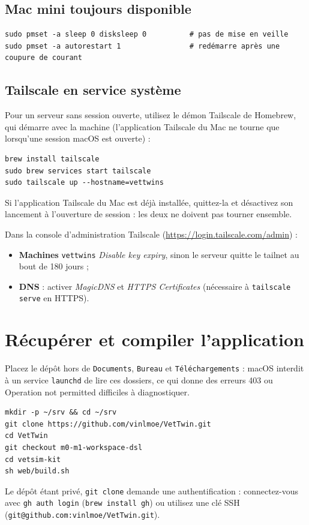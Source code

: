 \documentclass[11pt,a4paper]{article}
\newcommand{\cmd}[1]{\texttt{#1}}
\begin{document}
\subsection{Mac mini toujours disponible}
\begin{Verbatim}
sudo pmset -a sleep 0 disksleep 0          # pas de mise en veille
sudo pmset -a autorestart 1                # redémarre après une coupure de courant
\end{Verbatim}

\subsection{Tailscale en service système}
Pour un serveur sans session ouverte, utilisez le démon Tailscale de Homebrew, qui démarre avec la machine (l'application Tailscale du Mac ne tourne que lorsqu'une session macOS est ouverte) :
\begin{Verbatim}
brew install tailscale
sudo brew services start tailscale
sudo tailscale up --hostname=vettwins
\end{Verbatim}
Si l'application Tailscale du Mac est déjà installée, quittez-la et désactivez son lancement à l'ouverture de session : les deux ne doivent pas tourner ensemble.

Dans la console d'administration Tailscale (\url{https://login.tailscale.com/admin}) :
\begin{itemize}
  \item \textbf{Machines} \textrightarrow{} \cmd{vettwins} \textrightarrow{} \emph{Disable key expiry}, sinon le serveur quitte le tailnet au bout de 180 jours ;
  \item \textbf{DNS} : activer \emph{MagicDNS} et \emph{HTTPS Certificates} (nécessaire à \cmd{tailscale serve} en HTTPS).
\end{itemize}

\section{Récupérer et compiler l'application}
Placez le dépôt hors de \cmd{Documents}, \cmd{Bureau} et \cmd{Téléchargements} : macOS interdit à un service \cmd{launchd} de lire ces dossiers, ce qui donne des erreurs 403 ou \og Operation not permitted \fg{} difficiles à diagnostiquer.
\begin{Verbatim}
mkdir -p ~/srv && cd ~/srv
git clone https://github.com/vinlmoe/VetTwin.git
cd VetTwin
git checkout m0-m1-workspace-dsl
cd vetsim-kit
sh web/build.sh
\end{Verbatim}
Le dépôt étant privé, \cmd{git clone} demande une authentification : connectez-vous avec \cmd{gh auth login} (\cmd{brew install gh}) ou utilisez une clé SSH (\cmd{git@github.com:vinlmoe/VetTwin.git}).
\end{document}
